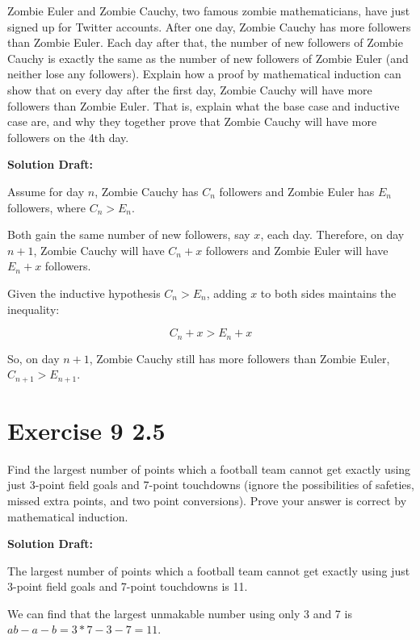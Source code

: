 \documentclass{article}
\begin{document}
Zombie Euler and Zombie Cauchy, two famous zombie mathematicians, have just signed up for Twitter accounts. After one day, Zombie Cauchy has more followers than Zombie Euler. Each day after that, the number of new followers of Zombie Cauchy is exactly the same as the number of new followers of Zombie Euler (and neither lose any followers). Explain how a proof by mathematical induction can show that on every day after the first day, Zombie Cauchy will have more followers than Zombie Euler. That is, explain what the base case and inductive case are, and why they together prove that Zombie Cauchy will have more followers on the 4th day.

\vspace{0.5cm}
\noindent\textbf{Solution Draft:} 
\vspace{0.2cm}

Assume for day $n$, Zombie Cauchy has $C_n$ followers and Zombie Euler has $E_n$ followers, where $C_n > E_n$.

Both gain the same number of new followers, say $x$, each day. Therefore, on day $n+1$, Zombie Cauchy will have $C_n + x$ followers and Zombie Euler will have $E_n + x$ followers.

Given the inductive hypothesis $C_n > E_n$, adding $x$ to both sides maintains the inequality:

\[
C_n + x > E_n + x
\]

So, on day $n+1$, Zombie Cauchy still has more followers than Zombie Euler, $C_{n+1} > E_{n+1}$.

\section*{Exercise 9 2.5}  

Find the largest number of points which a football team cannot get exactly using just 3-point field goals and 7-point touchdowns (ignore the possibilities of safeties, missed extra points, and two point conversions). Prove your answer is correct by mathematical induction.

\vspace{0.5cm}
\noindent\textbf{Solution Draft:} 
\vspace{0.2cm}

The largest number of points which a football team cannot get exactly using just 3-point field goals and 7-point touchdowns is 11. 

We can find that the largest unmakable number using only 3 and 7 is $ab-a-b=3*7-3-7=11$.
\end{document}
